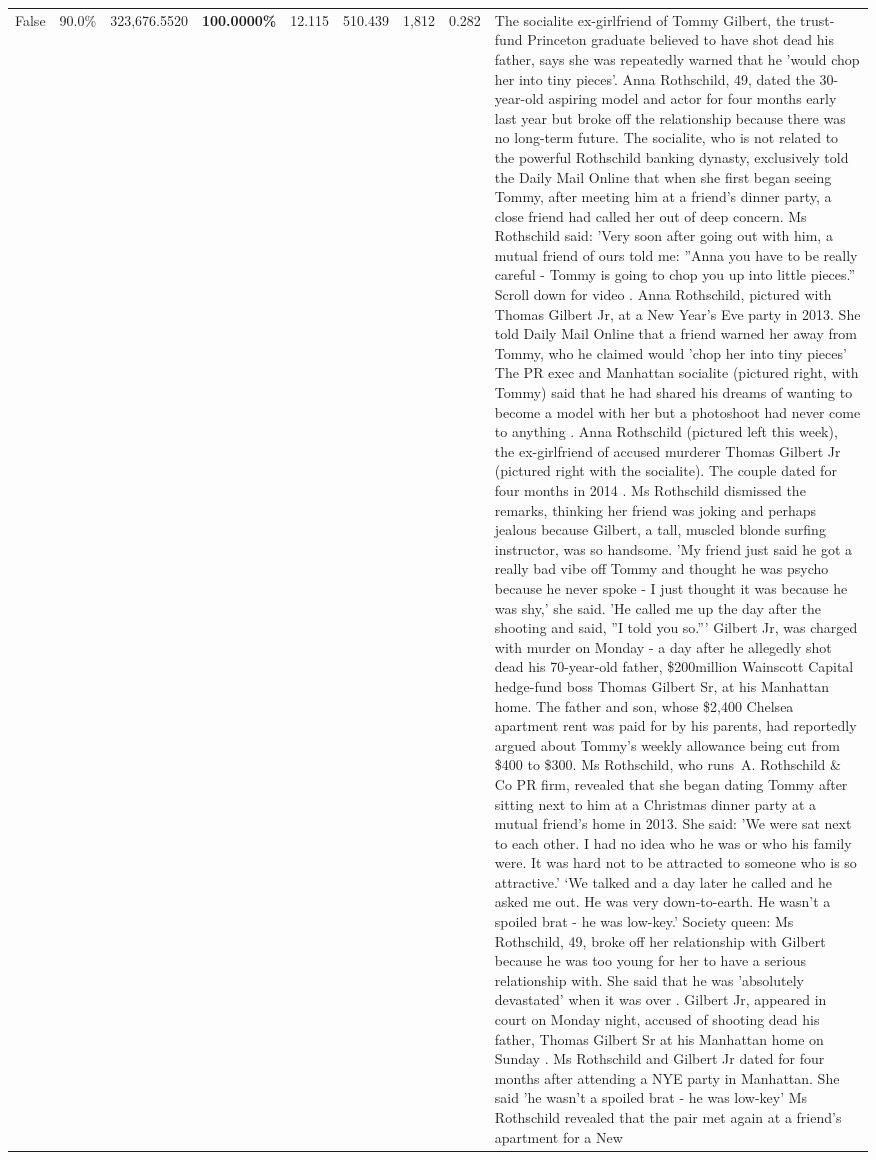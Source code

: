 \begin{table}[H]
\begin{tabular}{lllrlllll}
False & 90.0\% & 323,676.5520 & \bfseries \color{red} 100.0000\% & 12.115 & 510.439 & 1,812 & 0.282 & The socialite ex-girlfriend of Tommy Gilbert, the trust-fund Princeton graduate believed to have shot dead his father, says she was repeatedly warned that he 'would chop her into tiny pieces'. Anna Rothschild, 49, dated the 30-year-old aspiring model and actor for four months early last year but broke off the relationship because there was no long-term future. The socialite, who is not related to the powerful Rothschild banking dynasty, exclusively told the Daily Mail Online that when she first began seeing Tommy, after meeting him at a friend's dinner party, a close friend had called her out of deep concern. Ms Rothschild said: 'Very soon after going out with him, a mutual friend of ours told me: ''Anna you have to be really careful - Tommy is going to chop you up into little pieces.'' Scroll down for video . Anna Rothschild, pictured with Thomas Gilbert Jr, at a New Year's Eve party in 2013. She told Daily Mail Online that a friend warned her away from Tommy, who he claimed would 'chop her into tiny pieces' The PR exec and Manhattan socialite (pictured right, with Tommy) said that he had shared his dreams of wanting to become a model with her but a photoshoot had never come to anything . Anna Rothschild (pictured left this week), the ex-girlfriend of accused murderer Thomas Gilbert Jr (pictured right with the socialite). The couple dated for four months in 2014 . Ms Rothschild dismissed the remarks, thinking her friend was joking and perhaps jealous because Gilbert, a tall, muscled blonde surfing instructor, was so handsome. 'My friend just said he got a really bad vibe off Tommy and thought he was psycho because he never spoke - I just thought it was because he was shy,' she said. 'He called me up the day after the shooting and said, ''I told you so.''' Gilbert Jr, was charged with murder on Monday - a day after he allegedly shot dead his 70-year-old father, \$200million Wainscott Capital hedge-fund boss Thomas Gilbert Sr, at his Manhattan home. The father and son, whose \$2,400 Chelsea apartment rent was paid for by his parents, had reportedly argued about Tommy's weekly allowance being cut from \$400 to \$300. Ms Rothschild, who runs A. Rothschild \& Co PR firm, revealed that she began dating Tommy after sitting next to him at a Christmas dinner party at a mutual friend's home in 2013. She said: 'We were sat next to each other. I had no idea who he was or who his family were. It was hard not to be attracted to someone who is so attractive.' ‘We talked and a day later he called and he asked me out. He was very down-to-earth. He wasn’t a spoiled brat - he was low-key.’ Society queen: Ms Rothschild, 49, broke off her relationship with Gilbert because he was too young for her to have a serious relationship with. She said that he was 'absolutely devastated' when it was over . Gilbert Jr, appeared in court on Monday night, accused of shooting dead his father, Thomas Gilbert Sr at his Manhattan home on Sunday . Ms Rothschild and Gilbert Jr dated for four months after attending a NYE party in Manhattan. She said 'he wasn't a spoiled brat - he was low-key' Ms Rothschild revealed that the pair met again at a friend’s apartment for a New 
\end{tabular}
\end{table}
